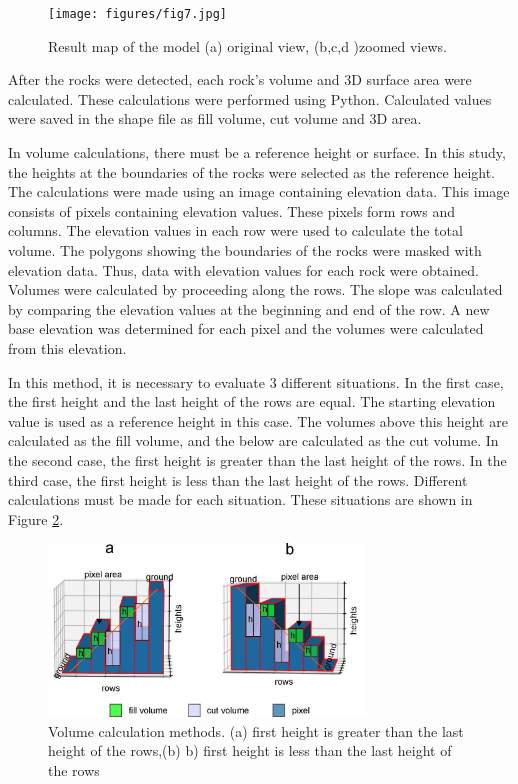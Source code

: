 \documentclass[a4paper,fleqn]{cas-sc}
\begin{document}
\begin{figure}
	\centering
	\texttt{[image: figures/fig7.jpg]}
	\caption{Result map of the model (a) original view, (b,c,d )zoomed views.}
	\label{fig:Figure7}
\end{figure}

After the rocks were detected, each rock's volume and 3D surface area were calculated. These calculations were performed using Python. Calculated values were saved in the shape file as fill volume, cut volume and 3D area.

In volume calculations, there must be a reference height or surface. In this study, the heights at the boundaries of the rocks were selected as the reference height. The calculations were made using an image containing elevation data. This image consists of pixels containing elevation values. These pixels form rows and columns. The elevation values in each row were used to calculate the total volume. The polygons showing the boundaries of the rocks were masked with elevation data. Thus, data with elevation values for each rock were obtained. Volumes were calculated by proceeding along the rows. The slope was calculated by comparing the elevation values at the beginning and end of the row. A new base elevation was determined for each pixel and the volumes were calculated from this elevation.

In this method, it is necessary to evaluate 3 different situations. In the first case, the first height and the last height of the rows are equal. The starting elevation value is used as a reference height in this case. The volumes above this height are calculated as the fill volume, and the below are calculated as the cut volume. In the second case, the first height is greater than the last height of the rows. In the third case, the first height is less than the last height of the rows. Different calculations must be made for each situation. These situations are shown in Figure \ref{fig:Figure8}.
\begin{figure}
	\centering
	\includegraphics[width=0.75\textwidth]{figures/fig8.jpg}
	\caption{Volume calculation methods. (a) first height is greater than the last height of the rows,(b) b) first height is less than the last height of the rows}
	\label{fig:Figure8}
\end{figure}
\end{document}
